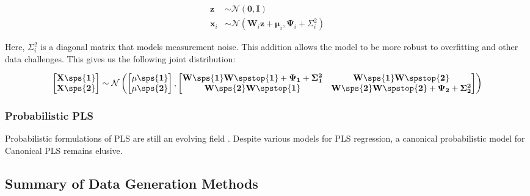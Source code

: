 \begin{align}
    \mathbf{z}& \sim \mathcal{N}(\mathbf{0}, \mathbf{I})                                            \\
    \mathbf{x}_i & \sim \mathcal{N}(\mathbf{W}_i \mathbf{z} + \boldsymbol{\mu}_i, \boldsymbol{\Psi}_i + \Sigma_i^2)
\end{align}

Here, \(\Sigma_i^2\) is a diagonal matrix that models measurement noise. This addition allows the model to be more
robust to overfitting and other data challenges. This gives us the following joint distribution:

\begin{align}
    \begin{bmatrix} \bold{X\sps{1}} \\ \bold{X\sps{2}} \end{bmatrix} \sim \mathcal{N} \left( \begin{bmatrix} \bold{\mu\sps{1}} \\ \bold{\mu\sps{2}} \end{bmatrix}, \begin{bmatrix} \bold{W\sps{1}W\spstop{1}} + \bold{\Psi_1} + \bold{\Sigma_1^2} & \bold{W\sps{1}W\spstop{2}} \\ \bold{W\sps{2}W\spstop{1}} & \bold{W\sps{2}W\spstop{2}} + \bold{\Psi_2} + \bold{\Sigma_2^2} \end{bmatrix} \right)
\end{align}

\subsubsection{Probabilistic PLS}

Probabilistic formulations of PLS are still an evolving field \cite{el2018probabilistic,zheng2016probabilistic}.
Despite various models for PLS regression, a canonical probabilistic model for Canonical PLS remains elusive.

\subsection{Summary of Data Generation Methods}

